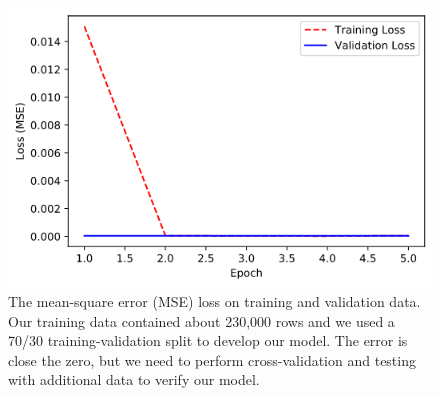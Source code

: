 \documentclass[conference]{IEEEtran}
\begin{document}
\begin{figure}[htbp]
    \includegraphics[width=\linewidth]{img/loss.png}
    \caption{The mean-square error (MSE) loss on training and validation data. Our training data contained about 230,000 rows and we used a 70/30 training-validation split to develop our model. The error is close the zero, but we need to perform cross-validation and testing with additional data to verify our model.}
    \label{fig:model_loss}
\end{figure}
\end{document}
